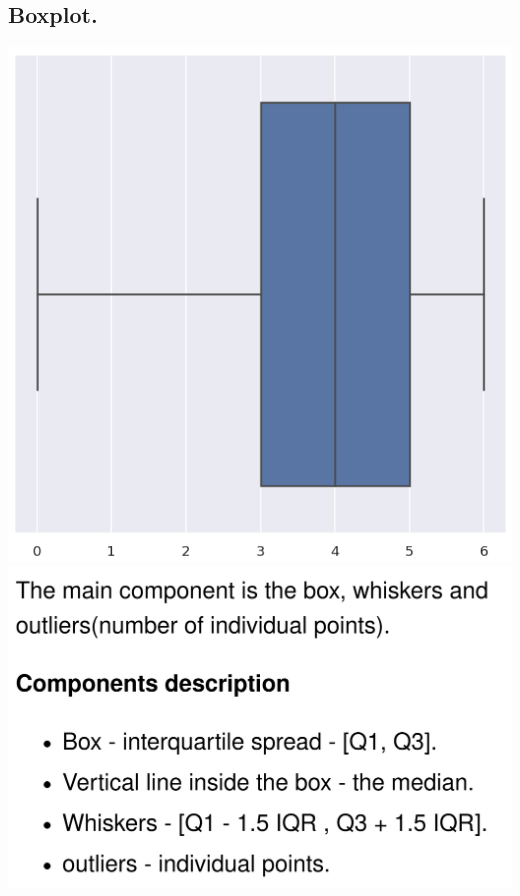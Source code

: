 \documentclass[14pt,a4paper]{scrartcl}
\theoremstyle{definition}
\theoremstyle{remark}
\theoremstyle{definition}
\theoremstyle{definition}
\begin{document}
\subsection*{Boxplot.}
  \begin{center}
   \includegraphics[scale=0.23]{assets/РР_126_Терещенко-cd2e904c.png}
  \includegraphics[scale=0.21]{assets/РР_126_Терещенко-539068e6.png}
  \end{center}
\newpage
\end{document}
